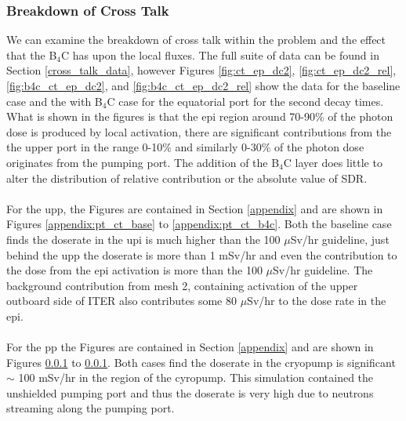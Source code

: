 \documentclass[12pt]{article}
\begin{document}
\subsubsection{Breakdown of Cross Talk}
We can examine the breakdown of cross talk within the problem and the effect 
that the B$_4$C has upon the local fluxes. The full suite of data can be found
in Section \ref{cross_talk_data}, however Figures \ref{fig:ct_ep_dc2},
\ref{fig:ct_ep_dc2_rel}, \ref{fig:b4c_ct_ep_dc2}, and \ref{fig:b4c_ct_ep_dc2_rel} 
show the data for the baseline case and the with B$_4$C case for the equatorial 
port for the second decay times. What is shown in the figures is that the \gls{epi}
region around 70-90\% of the photon dose is produced by local activation, there are
significant contributions from the the upper port in the range 0-10\% and 
similarly 0-30\% of the photon dose originates from the pumping port. The 
addition of the B$_4$C layer does little to alter the distribution of 
relative contribution or the absolute value of SDR.
\\
\\
For the \gls{upp}, the Figures are contained in Section \ref{appendix} and are 
shown in Figures \ref{appendix:pt_ct_base} to \ref{appendix:pt_ct_b4c}. 
Both the baseline case finds the doserate in 
the \gls{upi} is much higher than the 100 $\mu$Sv/hr guideline, just behind the 
\gls{upp} the doserate is more than 1 mSv/hr and even the contribution to the 
dose from the \gls{epi} activation is more than the 100 $\mu$Sv/hr guideline. 
The background contribution from mesh 2, containing activation of the upper
outboard side of ITER also contributes some 80 $\mu$Sv/hr to the dose rate in 
the \gls{epi}.
\\
\\
For the \gls{pp} the Figures are contained in Section \ref{appendix} and are 
shown in Figures \ref{} to \ref{}. Both cases find the doserate in 
the cryopump is significant $\sim$ 100 mSv/hr in the region of the cyropump. 
This simulation contained the unshielded pumping port and thus the doserate is 
very high due to neutrons streaming along the pumping port. 
\end{document}
